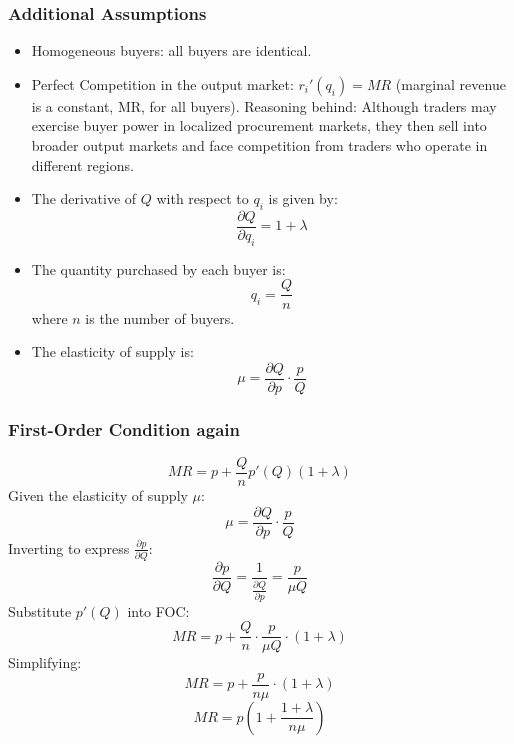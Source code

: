 \documentclass[12pt]{article}
\begin{document}
\subsubsection{Additional Assumptions}
\begin{itemize}
  \item Homogeneous buyers: all buyers are identical.
  \item Perfect Competition in the output market: \( r_i'(q_i) = MR \) (marginal revenue is a constant, MR, for all buyers). Reasoning behind: Although traders may exercise buyer power in localized procurement markets, they then sell into broader output markets and face competition from traders who operate in different regions.
  \item The derivative of \( Q \) with respect to \( q_i \) is given by:
    \begin{equation}
    \frac{\partial Q}{\partial q_i} = 1 + \lambda
    \end{equation}
  \item The quantity purchased by each buyer is:
    \begin{equation}
    q_i = \frac{Q}{n}
    \end{equation}
    where \( n \) is the number of buyers.
  \item The elasticity of supply is:
    \begin{equation}
    \mu = \frac{\partial Q}{\partial p} \cdot \frac{p}{Q}
    \end{equation}
\end{itemize}

\subsubsection{First-Order Condition again}
\begin{equation}
MR = p + \frac{Q}{n} p'(Q) (1 + \lambda)
\end{equation}
Given the elasticity of supply \(\mu\):
\begin{equation}
\mu = \frac{\partial Q}{\partial p} \cdot \frac{p}{Q}
\end{equation}
Inverting to express \(\frac{\partial p}{\partial Q}\):
\begin{equation}
\frac{\partial p}{\partial Q} = \frac{1}{\frac{\partial Q}{\partial p}} = \frac{p}{\mu Q}
\end{equation}
Substitute \( p'(Q) \) into FOC:
\begin{equation}
MR = p + \frac{Q}{n} \cdot \frac{p}{\mu Q} \cdot (1 + \lambda)
\end{equation}
Simplifying:
\begin{equation}
MR = p + \frac{p}{n \mu} \cdot (1 + \lambda)
\end{equation}
\begin{equation}
MR = p \left(1 + \frac{1 + \lambda}{n \mu}\right)
\end{equation}
\end{document}
